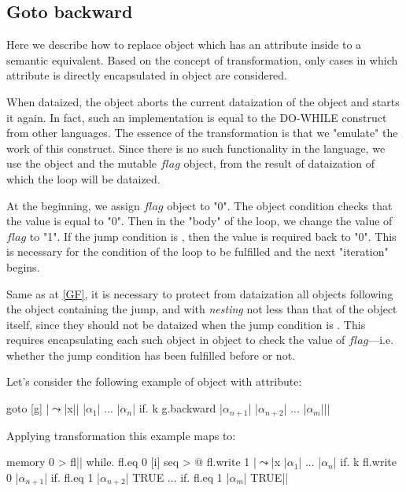 \documentclass[sigplan,review,11pt,nonacm,natbib=false]{acmart}
\theoremstyle{theorems}
\begin{document}
    \subsection{Goto backward} \label{GB}
    Here we describe how to replace  object which has an attribute  inside to a semantic equivalent.
    Based on the concept of transformation, only cases in which attribute  is directly encapsulated in  object are considered.

    When dataized, the  object aborts the current dataization of the  object and starts it again.
    In fact, such an implementation is equal to the DO-WHILE construct from other languages.
    The essence of the transformation is that we "emulate" the work of this construct.
    Since there is no such functionality in the language, we use the  object and the mutable $flag$ object, from the result of dataization of which the loop will be dataized.

    At the beginning, we assign $flag$ object to "0". The  object condition checks that the  value is equal to "0". Then in the "body" of the loop, we change the value of $flag$ to "1". If the jump condition is , then the  value is required back to "0". This is necessary for the condition of the loop to be fulfilled and the next "iteration" begins.

    Same as at \ref{GF}, it is necessary to protect from dataization all objects following the  object containing the jump, and with \emph{nesting} not less than that of the  object itself, since they should not be dataized when the jump condition is .
    This requires encapsulating each such object in object  to check the value of $flag$---i.e. whether the jump condition has been fulfilled before or not.

    Let's consider the following example of object  with  attribute:
    \begin{ffcode}
        goto
        [g]
        |$\leadsto$|x|$\label{ln:GB0}$|
        |$\alpha_1$|
        ...
        |$\alpha_n$|
        if.
        k
        g.backward
        |$\alpha_{n+1}$|
        |$\alpha_{n+2}$|
        ...
        |$\alpha_{m}$||$\label{ln:GB1}$|
    \end{ffcode}
    Applying transformation this example maps to:
    \begin{ffcode}
        memory 0 > fl|$\label{ln:TGB0}$|
        while.
        fl.eq 0
        [i]
        seq > @
        fl.write 1
        |$\leadsto$|x
        |$\alpha_1$|
        ...
        |$\alpha_n$|
        if.
        k
        fl.write 0
        |$\alpha_{n+1}$|
        if.
        fl.eq 1
        |$\alpha_{n+2}$|
        TRUE
        ...
        if.
        fl.eq 1
        |$\alpha_{m}$|
        TRUE|$\label{ln:TGB1}$|
    \end{ffcode}
\end{document}

